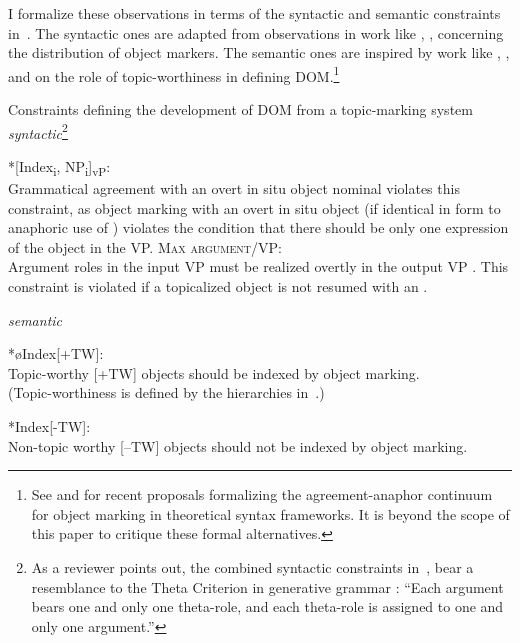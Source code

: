 \documentclass[output=paper]{LSP/langsci}
\begin{document}
I formalize these observations in terms of the syntactic and semantic
constraints in~. The syntactic ones are
adapted from observations in work like \citet{Bresnanetal1987Topic},
\citet{Morimoto2002Prominence}, \citet{Creissels2006Typology}
concerning the distribution of object markers. The semantic ones are
inspired by work like \citet{Aissen2003Differential},
\citet{Dalrympleetal2011Objects}, \citet{Iemmolo2013Symmetric,Iemmolo2014Differential} 
and \citet{Morimoto2002Prominence} on the role of topic-worthiness in
defining DOM.\footnote{See \citet{Morimoto2002Prominence} and
\citet{vanderWal2015Bantu} for recent proposals formalizing the agreement-anaphor continuum for
  object marking in theoretical syntax frameworks. It is beyond
 the scope of this paper to critique these formal alternatives.}

{
\begin{exe}
\ex
\label{02-do-ex:34}
Constraints defining the development of DOM from a topic-marking system\\
\textit{syntactic}\footnote{As a reviewer points out, the combined syntactic constraints in~,  bear a resemblance to the Theta Criterion in generative grammar \citet{Chomsky1981Lectures}: “Each argument bears one and only one theta-role, and each theta-role is assigned to one and only one argument.”} 
\begin{xlist}
\ex
\label{02-do-ex:34a}
*[Index\textsubscript{i}, NP\textsubscript{i}]\textsubscript{vP}:\\
Grammatical agreement with an overt in situ object nominal violates this constraint, as object marking with an overt in situ object (if identical in form to anaphoric use of ) violates the condition that there should be only one expression of the object in the VP.
\ex
\label{02-do-ex:34b}
\textsc{Max argument/VP}:\\
Argument roles in the input VP must be realized overtly in the output VP \citep{Morimoto2002Prominence}. This constraint is violated if a topicalized object is not resumed with an .
\end{xlist}
\textit{semantic}
\begin{xlist}
\label{02-do-ex:34c}
*øIndex[+TW]:\\
Topic-worthy [+TW] objects should be indexed by object marking. \citet{Aissen2003Differential}\\
(Topic-worthiness is defined by the  hierarchies in~.)

\label{02-do-ex:34d}
*Index[-TW]:\\
Non-topic worthy [–TW] objects should not be indexed by object marking.
\end{xlist}
\end{exe}
}
\end{document}
